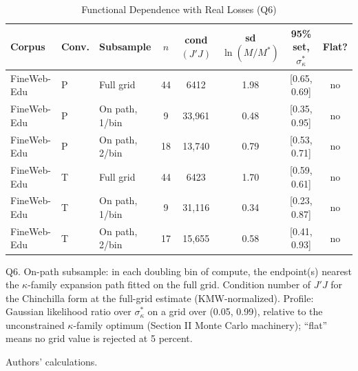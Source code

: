 \begin{table}[tp]
\centering
\caption{Functional Dependence with Real Losses (Q6)}
\label{tab:m9-onpath}
\footnotesize
\setlength{\tabcolsep}{3pt}
\begin{tabular*}{\textwidth}{@{\extracolsep{\fill}}lllccccc@{}}
\toprule
Corpus & Conv. & Subsample & $n$ & cond$(J'J)$ & sd $\ln(M/M^*)$ & 95\% set, $\sigma^*_\kappa$ & Flat? \\
\midrule
FineWeb-Edu & P & Full grid & 44 & 6412 & 1.98 & [0.65, 0.69] & no \\
FineWeb-Edu & P & On path, 1/bin & 9 & 33{,}961 & 0.48 & [0.35, 0.95] & no \\
FineWeb-Edu & P & On path, 2/bin & 18 & 13{,}740 & 0.79 & [0.53, 0.71] & no \\
FineWeb-Edu & T & Full grid & 44 & 6423 & 1.70 & [0.59, 0.61] & no \\
FineWeb-Edu & T & On path, 1/bin & 9 & 31{,}116 & 0.34 & [0.23, 0.87] & no \\
FineWeb-Edu & T & On path, 2/bin & 17 & 15{,}655 & 0.58 & [0.41, 0.93] & no \\
\bottomrule
\end{tabular*}

\begin{tablenotes}
Q6. On-path subsample: in each doubling bin of compute, the endpoint(s) nearest the $\kappa$-family expansion path fitted on the full grid. Condition number of $J'J$ for the Chinchilla form at the full-grid estimate (KMW-normalized). Profile: Gaussian likelihood ratio over $\sigma^*_\kappa$ on a grid over (0.05, 0.99), relative to the unconstrained $\kappa$-family optimum (Section II Monte Carlo machinery); ``flat'' means no grid value is rejected at 5 percent.
\end{tablenotes}

\begin{tablenotes}[Source]
Authors' calculations.
\end{tablenotes}
\end{table}
